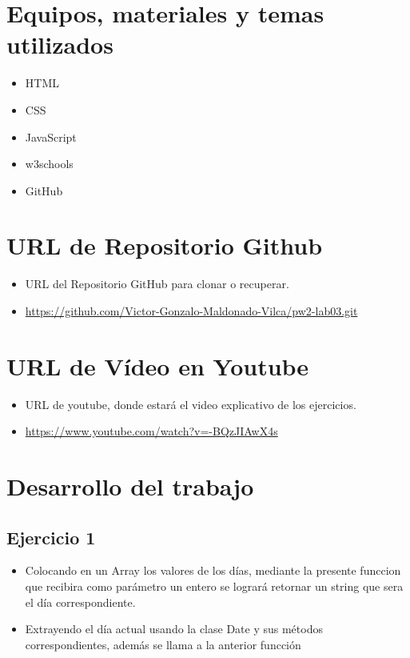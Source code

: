 \documentclass{article}
\begin{document}
		
	\section{Equipos, materiales y temas utilizados}
	\begin{itemize}
		\item HTML
		\item CSS
		\item JavaScript
		\item w3schools
        \item GitHub
        
	\end{itemize}
 
	
	\section{URL de Repositorio Github}
	\begin{itemize}
		\item URL del Repositorio GitHub para clonar o recuperar.
		\item \url{https://github.com/Victor-Gonzalo-Maldonado-Vilca/pw2-lab03.git}
	\end{itemize}

	\section{URL de Vídeo en Youtube}
	\begin{itemize}
		\item URL de youtube, donde estará el video explicativo de los ejercicios.
		\item \url{https://www.youtube.com/watch?v=-BQzJIAwX4s}
	\end{itemize}


    \section{Desarrollo del trabajo}
    \subsection{Ejercicio 1}
    \begin{itemize}
    	\item Colocando en un Array los valores de los días, mediante la presente funccion que recibira como parámetro un entero se logrará retornar un string que sera el día correspondiente. 
    	
    	\newpage
    	\item Extrayendo el día actual usando la clase Date y sus métodos correspondientes, además se llama a la anterior funcción
    	
    \end{itemize}
\end{document}
